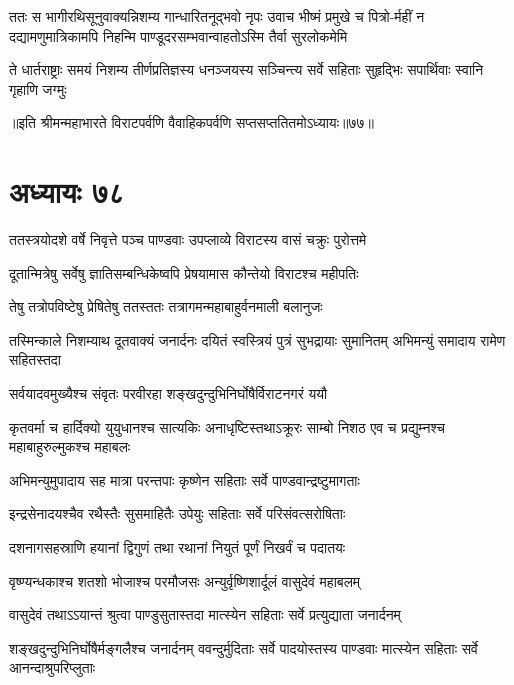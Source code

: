 
\threelineshloka
{ततः स भागीरथिसूनुवाक्यन्निशम्य गान्धारितनूद्भवो नृपः}
{उवाच भीष्मं प्रमुखे च पित्रो-र्महीं न दद्यामणुमात्रिकामपि}
{निहन्मि पाण्डूदरसम्भवान्वाहतोऽस्मि तैर्वा सुरलोकमेमि}


\fourlineindentedshloka
{ते धार्तराष्ट्राः समयं निशम्य}
{तीर्णप्रतिज्ञस्य धनञ्जयस्य }
{सञ्चिन्त्य सर्वे सहिताः सुहृद्भिः}
{सपार्थिवाः स्वानि गृहाणि जग्मुः}

॥इति श्रीमन्महाभारते विराटपर्वणि वैवाहिकपर्वणि सप्तसप्ततितमोऽध्यायः॥७७॥

\chapter{अध्यायः ७८}

\twolineshloka
{ततस्त्रयोदशे वर्षे निवृत्ते पञ्च पाण्डवाः}
{उपप्लाव्ये विराटस्य वासं चक्रुः पुरोत्तमे}


\twolineshloka
{दूतान्मित्रेषु सर्वेषु ज्ञातिसम्बन्धिकेष्वपि}
{प्रेषयामास कौन्तेयो विराटश्च महीपतिः}


\twolineshloka
{तेषु तत्रोपविष्टेषु प्रेषितेषु ततस्ततः}
{तत्रागमन्महाबाहुर्वनमाली बलानुजः}


\threelineshloka
{तस्मिन्काले निशम्याथ दूतवाक्यं जनार्दनः}
{दयितं स्वस्त्रियं पुत्रं सुभद्रायाः सुमानितम्}
{अभिमन्युं समादाय रामेण सहितस्तदा}


\twolineshloka
{सर्वयादवमुख्यैश्च संवृतः परवीरहा}
{शङ्खदुन्दुभिनिर्घोषैर्विराटनगरं ययौ}


\threelineshloka
{कृतवर्मा च हार्दिक्यो युयुधानश्च सात्यकिः}
{अनाधृष्टिस्तथाऽक्रूरः साम्बो निशठ एव च}
{प्रद्युम्नश्च महाबाहुरुल्मुकश्च महाबलः}


\twolineshloka
{अभिमन्युमुपादाय सह मात्रा परन्तपाः}
{कृष्णेन सहिताः सर्वे पाण्डवान्द्रष्टुमागताः}


\twolineshloka
{इन्द्रसेनादयश्चैव रथैस्तैः सुसमाहितैः}
{उपेयुः सहिताः सर्वे परिसंवत्सरोषिताः}


\twolineshloka
{दशनागसहस्राणि हयानां द्विगुणं तथा}
{रथानां नियुतं पूर्णं निखर्वं च पदातयः}


\twolineshloka
{वृष्ण्यन्धकाश्च शतशो भोजाश्च परमौजसः}
{अन्युर्वृष्णिशार्दूलं वासुदेवं महाबलम्}


\twolineshloka
{वासुदेवं तथाऽऽयान्तं श्रुत्वा पाण्डुसुतास्तदा}
{मात्स्येन सहिताः सर्वे प्रत्युद्याता जनार्दनम्}


\threelineshloka
{शङ्खदुन्दुभिनिर्घोषैर्मङ्गलैश्च जनार्दनम्}
{ववन्दुर्मुदिताः सर्वे पादयोस्तस्य पाण्डवाः}
{मात्स्येन सहिताः सर्वे आनन्दाश्रुपरिप्लुताः}

